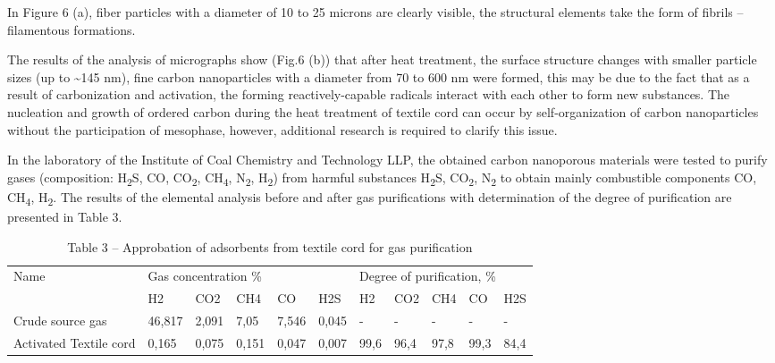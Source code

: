 \begin{multicols}{2}
In Figure 6 (a), fiber particles with a diameter of 10 to 25 microns are
clearly visible, the structural elements take the form of fibrils --
filamentous formations.

The results of the analysis of micrographs show (Fig.6 (b)) that after
heat treatment, the surface structure changes with smaller particle
sizes (up to \textasciitilde145 nm), fine carbon nanoparticles with a
diameter from 70 to 600 nm were formed, this may be due to the fact that
as a result of carbonization and activation, the forming
reactively-capable radicals interact with each other to form new
substances. The nucleation and growth of ordered carbon during the heat
treatment of textile cord can occur by self-organization of carbon
nanoparticles without the participation of mesophase, however,
additional research is required to clarify this issue.

In the laboratory of the Institute of Coal Chemistry and Technology LLP,
the obtained carbon nanoporous materials were tested to purify gases
(composition: H\textsubscript{2}S, CO, CO\textsubscript{2},
CH\textsubscript{4}, N\textsubscript{2}, H\textsubscript{2}) from
harmful substances H\textsubscript{2}S, CO\textsubscript{2},
N\textsubscript{2} to obtain mainly combustible components CO,
CH\textsubscript{4}, H\textsubscript{2}. The results of the elemental
analysis before and after gas purifications with determination of the
degree of purification are presented in Table 3.
\end{multicols}

\begin{table}[H]
\caption*{Table 3 -- Approbation of adsorbents from textile cord for gas purification}
\centering
\begin{tabular}{|l|lllll|lllll|}
\hline
\multirow{2}{*}{Name} & \multicolumn{5}{l|}{Gas concentration \%} & \multicolumn{5}{l|}{Degree of purification, \%} \\ \cline{2-11}
 & \multicolumn{1}{l|}{H2} & \multicolumn{1}{l|}{CO2} & \multicolumn{1}{l|}{CH4} & \multicolumn{1}{l|}{CO} & H2S & \multicolumn{1}{l|}{H2} & \multicolumn{1}{l|}{CO2} & \multicolumn{1}{l|}{CH4} & \multicolumn{1}{l|}{CO} & H2S \\ \hline
Crude source gas & \multicolumn{1}{l|}{46,817} & \multicolumn{1}{l|}{2,091} & \multicolumn{1}{l|}{7,05} & \multicolumn{1}{l|}{7,546} & 0,045 & \multicolumn{1}{l|}{-} & \multicolumn{1}{l|}{-} & \multicolumn{1}{l|}{-} & \multicolumn{1}{l|}{-} & - \\ \hline
Activated Textile cord & \multicolumn{1}{l|}{0,165} & \multicolumn{1}{l|}{0,075} & \multicolumn{1}{l|}{0,151} & \multicolumn{1}{l|}{0,047} & 0,007 & \multicolumn{1}{l|}{99,6} & \multicolumn{1}{l|}{96,4} & \multicolumn{1}{l|}{97,8} & \multicolumn{1}{l|}{99,3} & 84,4 \\ \hline
\end{tabular}
\end{table}

